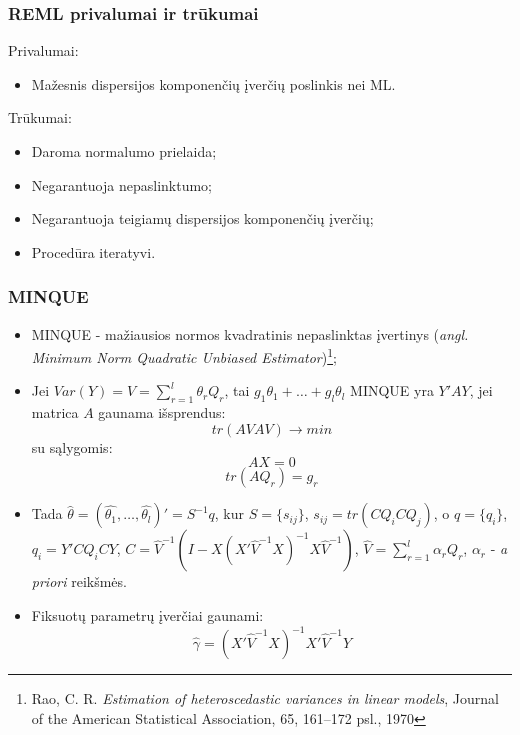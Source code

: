 \documentclass[utf8,hyperref={unicode,pdftex}]{beamer}
\begin{document}
\begin{frame}
\frametitle{REML privalumai ir trūkumai}
Privalumai:
\begin{itemize}
\item Mažesnis dispersijos komponenčių įverčių poslinkis nei ML.
\end{itemize}
Trūkumai:
\begin{itemize}
\item Daroma normalumo prielaida;
\item Negarantuoja nepaslinktumo;
\item Negarantuoja teigiamų dispersijos komponenčių įverčių;
\item Procedūra iteratyvi.
\end{itemize}
\end{frame}
\begin{frame}
\frametitle{MINQUE}
\begin{small}
\begin{itemize}
\item \indent MINQUE - mažiausios normos kvadratinis nepaslinktas įvertinys (\textit{angl. Minimum Norm Quadratic Unbiased Estimator})\footnote{Rao, C. R.  \textit{Estimation of heteroscedastic variances in linear models}, Journal of the American Statistical Association, 65, 161–172 psl., 1970};\\
 

\item \indent Jei $Var(Y)=V= \sum^l_{r=1}\theta_r Q_r$, tai $g_1 \theta_1+\dots+g_l \theta_l$ MINQUE yra $Y'AY$, jei matrica $A$ gaunama išsprendus:
\[tr(AVAV) \to min\]
su sąlygomis:
\[AX = 0\]
\[tr(AQ_r)=g_r\]
\item Tada $\hat{\theta} = (\hat{\theta_1},\dots,\hat{\theta_l})'=S^{-1}q$, kur $S=\{s_{ij}\}$, $s_{ij}=tr(CQ_iCQ_j)$, o
$q=\{q_i\}$, $q_i=Y'CQ_iCY$, $C = \hat{V}^{-1}(I-X(X' \hat{V}^{-1}X)^{-1}X \hat{V}^{-1})$, $\hat{V}=\sum^l_{r=1}\alpha_rQ_r$, $\alpha_r$ - \textit{a priori} reikšmės.

\item Fiksuotų parametrų įverčiai gaunami:
\[\hat{\gamma}=(X'\hat{V}^{-1}X)^{-1}X'\hat{V}^{-1}Y\]
\end{itemize}
\end{small}
\end{frame}
\end{document}

